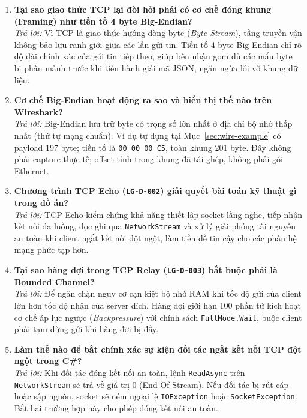 \documentclass[12pt,a4paper]{article}
\begin{document}
\begin{enumerate}[label=\textbf{\arabic*.}]
  \item \textbf{Tại sao giao thức TCP lại đòi hỏi phải có cơ chế đóng khung (Framing) như tiền tố 4 byte Big-Endian?} \\
    \textit{Trả lời:} Vì TCP là giao thức hướng dòng byte (\textit{Byte Stream}), tầng truyền vận không bảo lưu ranh giới giữa các lần gửi tin. Tiền tố 4 byte Big-Endian chỉ rõ độ dài chính xác của gói tin tiếp theo, giúp bên nhận gom đủ các mẩu byte bị phân mảnh trước khi tiến hành giải mã JSON, ngăn ngừa lỗi vỡ khung dữ liệu.

  \item \textbf{Cơ chế Big-Endian hoạt động ra sao và hiển thị thế nào trên Wireshark?} \\
    \textit{Trả lời:} Big-Endian lưu trữ byte có trọng số lớn nhất ở địa chỉ bộ nhớ thấp nhất (thứ tự mạng chuẩn). Ví dụ tự dựng tại Mục~\ref{sec:wire-example} có payload 197 byte; tiền tố là \texttt{00 00 00 C5}, toàn khung 201 byte. Đây không phải capture thực tế; offset tính trong khung đã tái ghép, không phải gói Ethernet.

  \item \textbf{Chương trình TCP Echo (\texttt{LG-D-002}) giải quyết bài toán kỹ thuật gì trong đồ án?} \\
    \textit{Trả lời:} TCP Echo kiểm chứng khả năng thiết lập socket lắng nghe, tiếp nhận kết nối đa luồng, đọc ghi qua \texttt{NetworkStream} và xử lý giải phóng tài nguyên an toàn khi client ngắt kết nối đột ngột, làm tiền đề tin cậy cho các phân hệ mạng phức tạp hơn.

  \item \textbf{Tại sao hàng đợi trong TCP Relay (\texttt{LG-D-003}) bắt buộc phải là Bounded Channel?} \\
    \textit{Trả lời:} Để ngăn chặn nguy cơ cạn kiệt bộ nhớ RAM khi tốc độ gửi của client lớn hơn tốc độ nhận của server đích. Hàng đợi giới hạn 100 phần tử kích hoạt cơ chế áp lực ngược (\textit{Backpressure}) với chính sách \texttt{FullMode.Wait}, buộc client phải tạm dừng gửi khi hàng đợi bị đầy.

  \item \textbf{Làm thế nào để bắt chính xác sự kiện đối tác ngắt kết nối TCP đột ngột trong C\#?} \\
    \textit{Trả lời:} Khi đối tác đóng kết nối an toàn, lệnh \texttt{ReadAsync} trên \texttt{NetworkStream} sẽ trả về giá trị $0$ (End-Of-Stream). Nếu đối tác bị rút cáp hoặc sập nguồn, socket sẽ ném ngoại lệ \texttt{IOException} hoặc \texttt{SocketException}. Bắt hai trường hợp này cho phép đóng kết nối an toàn.


\end{enumerate}
\end{document}
